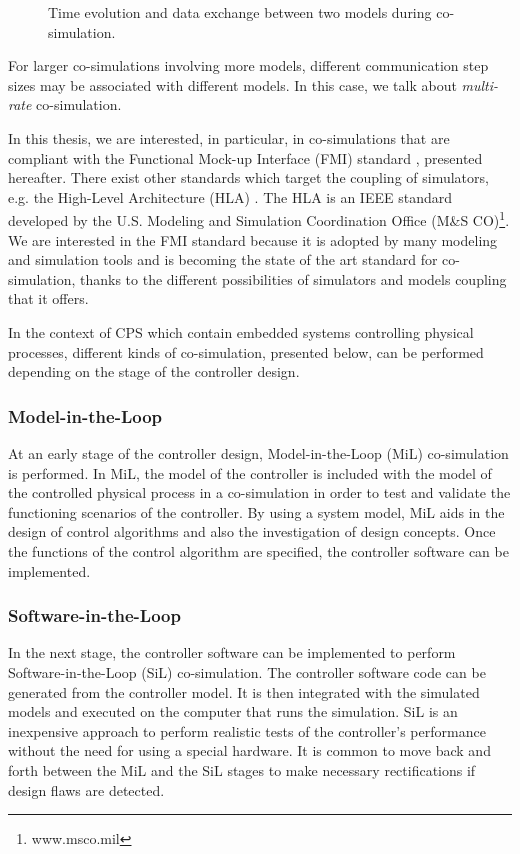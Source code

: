 \begin{figure}[phbt]
\centering

\caption{Time evolution and data exchange between two models during co-simulation.}
\label{fig:cosim}
\end{figure}

For larger co-simulations involving more models, different communication step sizes may be associated with different models. In this case, we talk about \textit{multi-rate} co-simulation.

In this thesis, we are interested, in particular, in co-simulations that are compliant with the Functional Mock-up Interface (FMI) standard \cite{fmi:2014}, presented hereafter. There exist other standards which target the coupling of simulators, e.g. the High-Level Architecture (HLA) \cite{ieee1516:2012}. The HLA is an IEEE standard developed by the U.S. Modeling and Simulation Coordination Office (M\&S CO)\footnote{www.msco.mil}. We are interested in the FMI standard because it is adopted by many modeling and simulation tools and is becoming the state of the art standard for co-simulation, thanks to the different possibilities of simulators and models coupling that it offers.

In the context of CPS which contain embedded systems controlling physical processes, different kinds of co-simulation, presented below, can be performed depending on the stage of the controller design.

\subsubsection{Model-in-the-Loop}

At an early stage of the controller design, Model-in-the-Loop (MiL) co-simulation is performed. In MiL, the model of the controller is included with the model of the controlled physical process in a co-simulation in order to test and validate the functioning scenarios of the controller. By using a system model, MiL aids in the design of control algorithms and also the investigation of design concepts. Once the functions of the control algorithm are specified, the controller software can be implemented.

\subsubsection{Software-in-the-Loop}

In the next stage, the controller software can be implemented to perform Software-in-the-Loop (SiL) co-simulation. The controller software code can be generated from the controller model. It is then integrated with the simulated models and executed on the computer that runs the simulation. SiL is an inexpensive approach to perform realistic tests of the controller’s performance without the need for using a special hardware. It is common to move back and forth between the MiL and the SiL stages to make necessary rectifications if design flaws are detected.

